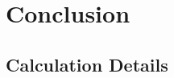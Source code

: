 \documentclass[12pt]{report}
\begin{document}
\chapter{Conclusion}\label{conclusion}


\begin{appendices}

\chapter{Calculation Details} \label{calc_details}






\end{appendices}


\newpage




\end{document}
